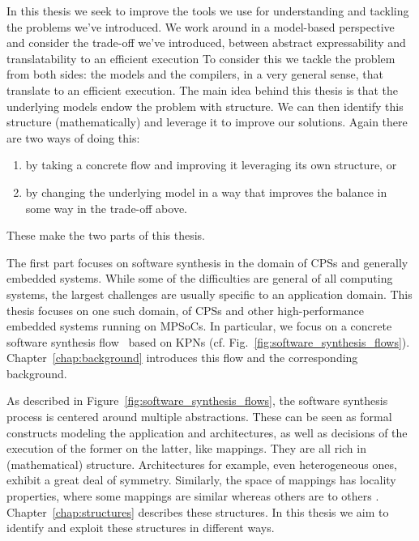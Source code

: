 In this thesis we seek to improve the tools we use for understanding and tackling the problems we've introduced. 
We work around in a model-based perspective and consider the trade-off we've introduced, between abstract expressability and translatability to an efficient execution
To consider this we tackle the problem from both sides: the models and the compilers, in a very general sense, that translate to an efficient execution.
The main idea behind this thesis is that the underlying models endow the problem with structure.
We can then identify this structure (mathematically) and leverage it to improve our solutions.
Again there are two ways of doing this: 
\begin{enumerate}
\item by taking a concrete flow and improving it leveraging its own structure, or
\item by changing the underlying model in a way that improves the balance in some way in the trade-off above.
\end{enumerate}
These make the two parts of this thesis.


The first part focuses on software synthesis in the domain of \acp{CPS} and generally embedded systems.
While some of the difficulties are general of all computing systems, the largest challenges are usually specific to an application domain.
This thesis focuses on one such domain, of \acp{CPS} and other high-performance embedded systems running on \acp{MPSoC}.
In particular, we focus on a concrete software synthesis flow~\cite{maps,castrillon2014thesis} based on \acp{KPN} (cf. Fig.~\ref{fig:software_synthesis_flows}). Chapter~\ref{chap:background} introduces this flow and the corresponding background.


As described in Figure~\ref{fig:software_synthesis_flows}, the software synthesis process is centered around multiple abstractions.
These can be seen as formal constructs modeling the application and architectures, as well as decisions of the execution of the former on the latter, like mappings.
They are all rich in (mathematical) structure.
Architectures for example, even heterogeneous ones, exhibit a great deal of symmetry.
Similarly, the space of mappings has locality properties, where some mappings are similar whereas others are to others . Chapter~\ref{chap:structures} describes these structures.
In this thesis we aim to identify and exploit these structures in different ways.

